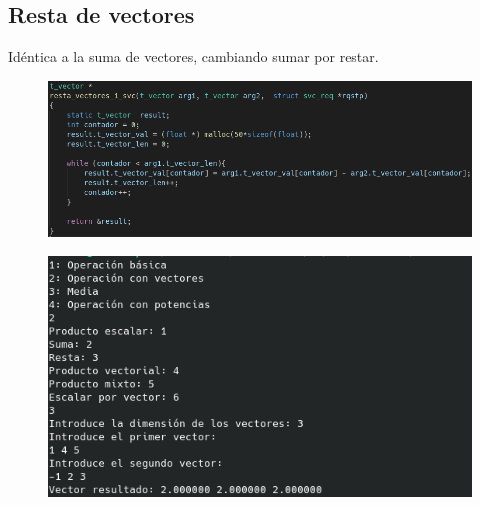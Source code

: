 \documentclass{article}
\begin{document}
	\subsection{Resta de vectores}
	Idéntica a la suma de vectores, cambiando sumar por restar.
	\begin{figure}[H]
		\centering
		\includegraphics[totalheight=4.7cm]{img/10.png}
	\end{figure}
\begin{figure}[H]
	\centering
	\includegraphics[totalheight=6.8cm]{img/11.png}
\end{figure}
\end{document}
